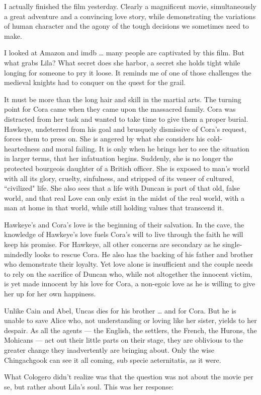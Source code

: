 \begin{quotex}
I actually finished the film yesterday. Clearly a magnificent movie, simultaneously a great adventure and a convincing love story, while demonstrating the variations of human character and the agony of the tough decisions we sometimes need to make.

I looked at Amazon and imdb … many people are captivated by this film. But what grabs Lila? What secret does she harbor, a secret she holds tight while longing for someone to pry it loose. It reminds me of one of those challenges the medieval knights had to conquer on the quest for the grail.

It must be more than the long hair and skill in the martial arts. The turning point for Cora came when they came upon the massacred family. Cora was distracted from her task and wanted to take time to give them a proper burial. Hawkeye, undeterred from his goal and brusquely dismissive of Cora's request, forces them to press on. She is angered by what she considers his cold-heartedness and moral failing. It is only when he brings her to see the situation in larger terms, that her infatuation begins. Suddenly, she is no longer the protected bourgeois daughter of a British officer. She is exposed to man's world with all its glory, cruelty, sinfulness, and stripped of its veneer of cultured, ``civilized" life. She also sees that a life with Duncan is part of that old, false world, and that real Love can only exist in the midst of the real world, with a man at home in that world, while still holding values that transcend it.

Hawkeye's and Cora's love is the beginning of their salvation. In the cave, the knowledge of Hawkeye's love fuels Cora's will to live through the faith he will keep his promise. For Hawkeye, all other concerns are secondary as he single-mindedly looks to rescue Cora. He also has the backing of his father and brother who demonstrate their loyalty. Yet love alone is insufficient and the couple needs to rely on the sacrifice of Duncan who, while not altogether the innocent victim, is yet made innocent by his love for Cora, a non-egoic love as he is willing to give her up for her own happiness.

Unlike Cain and Abel, Uncas dies for his brother … and for Cora. But he is unable to save Alice who, not understanding or loving like her sister, yields to her despair. As all the agents — the English, the settlers, the French, the Hurons, the Mohicans — act out their little parts on their stage, they are oblivious to the greater change they inadvertently are bringing about. Only the wise Chingachgook can see it all coming, sub specie aeternitatis, as it were. 

\end{quotex}
What Cologero didn't realize was that the question was not about the movie per se, but rather about Lila's soul. This was her response:

